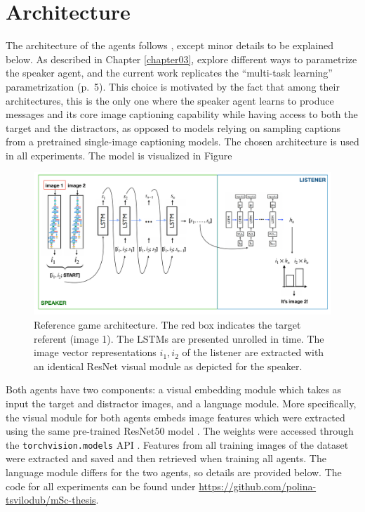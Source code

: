 \section{Architecture}
\label{architecture}
The architecture of the agents follows \textcite{lazaridou2020multi}, except minor details to be explained below. As described in Chapter \ref{chapter03}, \textcite{lazaridou2020multi} explore different ways to parametrize the speaker agent, and the current work replicates the ``multi-task learning'' parametrization (p.~5). This choice is motivated by the fact that among their architectures, this is the only one where the speaker agent learns to produce messages and its core image captioning capability while having access to both the target and the distractors, as opposed to models relying on sampling captions from a pretrained single-image captioning models. The chosen architecture is used in all experiments. The model is visualized in Figure
\begin{figure}[h]
	\centering
	\includegraphics[width=\linewidth]{images/architecture_viz_cropped.pdf}
	\caption{Reference game architecture. The red box indicates the target referent (image 1). The LSTMs are presented unrolled in time. The image vector representations $i_1, i_2$ of the listener are extracted with an identical ResNet visual module as depicted for the speaker.}
	\label{fig:architecture}
\end{figure}  

Both agents have two components: a visual embedding module which takes as input the target and distractor images, and a language module. More specifically, the visual module for both agents embeds image features which were extracted using the same pre-trained ResNet50 model \parencite{he2016deep}. The weights were accessed through the \texttt{torchvision.models} API \parencite{marcel2010torchvision}. Features from all training images of the dataset were extracted and saved and then retrieved when training all agents. 
The language module differs for the two agents, so details are provided below. 
The code for all experiments can be found under \url{https://github.com/polina-tsvilodub/mSc-thesis}. 


